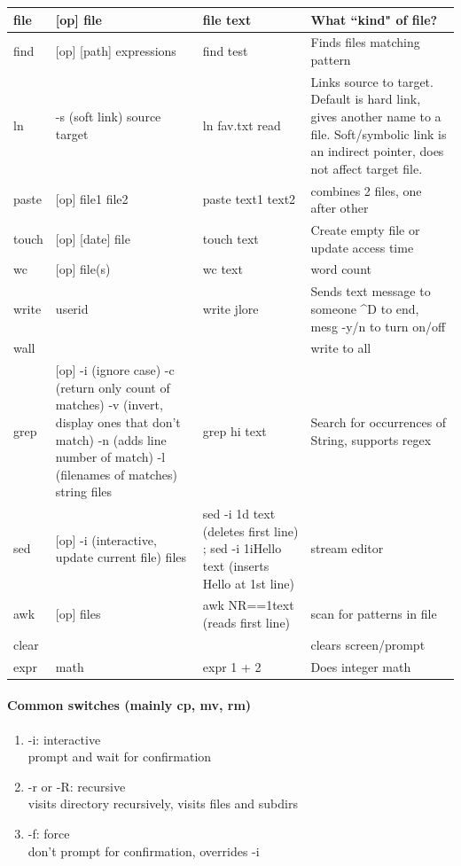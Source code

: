 \documentclass[12 pt]{article}
\begin{document}
\begin{tabularx}{\textwidth}{|X|X|X|X|}
		 file & [op] file & file text & What ``kind" of file?
		 \\\hline
		 find & [op] [path] expressions & find test & Finds files matching pattern
		 \\\hline
		 ln & -s (soft link) source target & ln fav.txt read & Links source to target. Default is hard link, gives another name to a file. Soft/symbolic link is an indirect pointer, does not affect target file.
		 \\\hline
		 paste & [op] file1 file2 & paste text1 text2 & combines 2 files, one after other
		 \\\hline
		 touch & [op] [date] file & touch text & Create empty file or update access time
		 \\\hline
		 wc & [op] file(s) & wc text & word count
		 \\\hline
		 write & userid & write jlore & Sends text message to someone \textasciicircum D to end, mesg -y/n to turn on/off
		 \\\hline
		 wall &&& write to all
		 \\\hline
		 grep & [op] -i (ignore case) -c (return only count of matches) -v (invert, display ones that don't match) -n (adds line number of match) -l (filenames of matches) string files & grep hi text & Search for occurrences of String, supports regex
		 \\\hline
		 sed & [op] -i (interactive, update current file) files & sed -i \textquotesingle 1d \textquotesingle text (deletes first line) ; sed -i \textquotesingle 1iHello \textquotesingle text (inserts Hello at 1st line) & stream editor
		 \\\hline
		 awk & [op] files & awk \textquotesingle NR==1\textquotesingle text (reads first line) & scan for patterns in file
		 \\\hline
		 clear &&& clears screen/prompt
		 \\\hline
		 expr & math & expr 1 + 2 & Does integer math
		 \\\hline
	\end{tabularx}
	\paragraph{Common switches (mainly cp, mv, rm)}
	\begin{enumerate}[.]
		\item -i: interactive
		\\ prompt and wait for confirmation
		\item -r or -R: recursive
		\\ visits directory recursively, visits files and subdirs
		\item -f: force
		\\ don't prompt for confirmation, overrides -i
	\end{enumerate}
\end{document}
